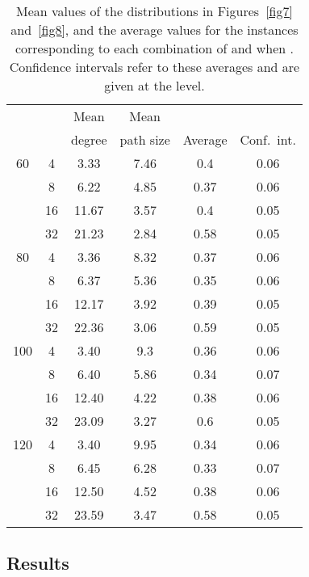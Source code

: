 \documentclass{article}
\begin{document}
\begin{table}[t]
\centering
\caption{Mean values of the distributions in Figures~\ref{fig7} and~\ref{fig8},
and the average  values for the   instances corresponding to
each combination of  and  when . Confidence intervals refer to
these averages and are given at the  level.}
\begin{tabular}{cccccc}
\hline
 &  & Mean   & Mean      & \multicolumn{2}{c}{ } \\ \cline{5-6}
    &          & degree & path size & Average & Conf.\ int. \\ \hline
60  & 4        & 3.33   & 7.46      & 0.4     & 0.06 \\
    & 8        & 6.22   & 4.85      & 0.37    & 0.06 \\
    & 16       & 11.67  & 3.57      & 0.4     & 0.05 \\
    & 32       & 21.23  & 2.84      & 0.58    & 0.05 \\ \hline
80  & 4        & 3.36   & 8.32      & 0.37    & 0.06 \\
    & 8        & 6.37   & 5.36      & 0.35    & 0.06 \\
    & 16       & 12.17  & 3.92      & 0.39    & 0.05 \\
    & 32       & 22.36  & 3.06      & 0.59    & 0.05 \\ \hline
100 & 4        & 3.40   & 9.3       & 0.36    & 0.06 \\
    & 8        & 6.40   & 5.86      & 0.34    & 0.07 \\
    & 16       & 12.40  & 4.22      & 0.38    & 0.06 \\
    & 32       & 23.09  & 3.27      & 0.6     & 0.05 \\ \hline
120 & 4        & 3.40   & 9.95      & 0.34    & 0.06 \\
    & 8        & 6.45   & 6.28      & 0.33    & 0.07 \\
    & 16       & 12.50  & 4.52      & 0.38    & 0.06 \\
    & 32       & 23.59  & 3.47      & 0.58    & 0.05 \\ \hline
\end{tabular}

 \label{tab1}
\end{table}

\subsection{Results}
\end{document}

